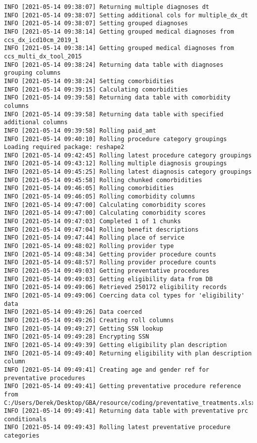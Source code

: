 \documentclass[
]{book}
\begin{document}
\begin{verbatim}
INFO [2021-05-14 09:38:07] Returning multiple diagnoses dt
INFO [2021-05-14 09:38:07] Setting additional cols for multiple_dx_dt
INFO [2021-05-14 09:38:07] Setting grouped diagnoses
INFO [2021-05-14 09:38:14] Getting grouped medical diagnoses from ccs_dx_icd10cm_2019_1
INFO [2021-05-14 09:38:14] Getting grouped medical diagnoses from ccs_multi_dx_tool_2015
INFO [2021-05-14 09:38:24] Returning data table with diagnoses grouping columns
INFO [2021-05-14 09:38:24] Setting comorbidities
INFO [2021-05-14 09:39:15] Calculating comorbidities
INFO [2021-05-14 09:39:58] Returning data table with comorbidity columns
INFO [2021-05-14 09:39:58] Returning data table with specified additional columns
INFO [2021-05-14 09:39:58] Rolling paid_amt
INFO [2021-05-14 09:40:10] Rolling procedure category groupings
Loading required package: reshape2
INFO [2021-05-14 09:42:45] Rolling latest procedure category groupings
INFO [2021-05-14 09:43:12] Rolling multiple diagnosis groupings
INFO [2021-05-14 09:45:25] Rolling latest diagnosis category groupings
INFO [2021-05-14 09:45:58] Rolling chunked comorbidities
INFO [2021-05-14 09:46:05] Rolling comorbidities
INFO [2021-05-14 09:46:05] Rolling comorbidity columns
INFO [2021-05-14 09:47:00] Calculating comorbidity scores
INFO [2021-05-14 09:47:00] Calculating comorbidity scores
INFO [2021-05-14 09:47:03] Completed 1 of 1 chunks
INFO [2021-05-14 09:47:04] Rolling benefit descriptions
INFO [2021-05-14 09:47:44] Rolling place of service
INFO [2021-05-14 09:48:02] Rolling provider type
INFO [2021-05-14 09:48:34] Getting provider procedure counts
INFO [2021-05-14 09:48:57] Rolling provider procedure counts
INFO [2021-05-14 09:49:03] Getting preventative procedures
INFO [2021-05-14 09:49:03] Getting eligibility data from DB
INFO [2021-05-14 09:49:06] Retrieved 250172 eligibility records
INFO [2021-05-14 09:49:06] Coercing data col types for 'eligibility' data
INFO [2021-05-14 09:49:26] Data coerced
INFO [2021-05-14 09:49:26] Creating roll columns
INFO [2021-05-14 09:49:27] Getting SSN lookup
INFO [2021-05-14 09:49:28] Encrypting SSN
INFO [2021-05-14 09:49:39] Getting eligibility plan description
INFO [2021-05-14 09:49:40] Returning eligibility with plan description column
INFO [2021-05-14 09:49:41] Creating age and gender ref for preventative procedures
INFO [2021-05-14 09:49:41] Getting preventative procedure reference from C:/Users/Derek/Desktop/GBA/resource/coding/preventative_treatments.xlsx
INFO [2021-05-14 09:49:41] Returning data table with preventative prc conditionals
INFO [2021-05-14 09:49:43] Rolling latest preventative procedure categories

\end{verbatim}
\end{document}
